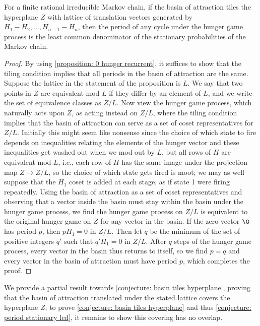 \begin{proposition}\label{proposition: tiling conjecture implies periodicity conjecture}
For a finite rational irreducible Markov chain, 
if the basin of attraction tiles the hyperplane $Z$ 
with lattice of translation vectors generated by $H_1-H_2,\dots,H_{n-1}-H_n$, 
then the period of any cycle under the hunger game process is 
the least common denominator of the stationary probabilities of the Markov chain.
\end{proposition}
\begin{proof}
By using \cref{proposition: 0 hunger recurrent}, it suffices to show that 
the tiling condition implies that all periods in the basin of attraction are the same.
Suppose the lattice in the statement of the proposition is $L$.
We say that two points in $Z$ are equivalent mod $L$ if they differ by 
an element of $L$, and we write the set of equivalence classes as $Z/L$.
Now view the hunger game process, which naturally acts upon $Z$, 
as acting instead on $Z/L$, where the tiling condition implies that 
the basin of attraction can serve as a set of coset representatives for $Z/L$.
Initially this might seem like nonsense since the choice of which state to fire
depends on inequalities relating the elements of the hunger vector 
and these inequalities get washed out when we mod out by $L$,
but all rows of $H$ are equivalent mod $L$, 
i.e., each row of $H$ has the same image under the projection map $Z\to Z/L$,
so the choice of which state gets fired is moot;
we may as well suppose that the $H_1$ coset
is added at each stage, as if state 1 were firing repeatedly.
Using the basin of attraction as a set of coset representatives 
and observing that a vector inside the basin 
must stay within the basin under the hunger game process, 
we find the hunger game process on $Z/L$ is equivalent to 
the original hunger game on $Z$ for any vector in the basin.
If the zero vector $\0$ has period $p$, then $pH_1=0$ in $Z/L$.
Then let $q$ be the minimum of the set of positive integers $q'$ 
such that $q'H_1=0$ in $Z/L$.
After $q$ steps of the hunger game process, 
every vector in the basin thus returns to itself, 
so we find $p=q$ and every vector in the basin of attraction must have period $p$, 
which completes the proof.
\end{proof}

We provide a partial result towards \cref{conjecture: basin tiles hyperplane}, 
proving that the basin of attraction translated under the stated lattice 
covers the hyperplane $Z$; 
to prove \cref{conjecture: basin tiles hyperplane} 
and thus \cref{conjecture: period stationary lcd}, 
it remains to show this covering has no overlap.

